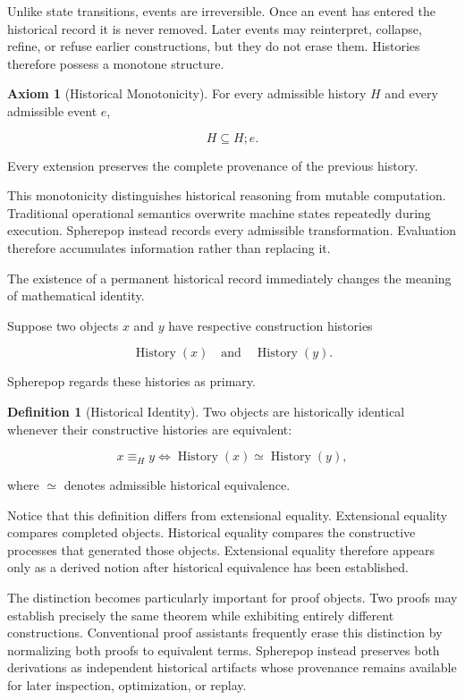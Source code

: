 \documentclass[12pt,oneside]{article}
\theoremstyle{definition}
\newtheorem{definition}[theorem]{Definition}
\newtheorem{axiom}[theorem]{Axiom}
\theoremstyle{remark}
\DeclareMathOperator{\History}{History}
\begin{document}
Unlike state transitions, events are irreversible. Once an event has entered the historical record it is never removed. Later events may reinterpret, collapse, refine, or refuse earlier constructions, but they do not erase them. Histories therefore possess a monotone structure.

\begin{axiom}[Historical Monotonicity]
For every admissible history $H$ and every admissible event $e$,

\[
H
\subseteq
H;e.
\]

Every extension preserves the complete provenance of the previous history.
\end{axiom}

This monotonicity distinguishes historical reasoning from mutable computation. Traditional operational semantics overwrite machine states repeatedly during execution. Spherepop instead records every admissible transformation. Evaluation therefore accumulates information rather than replacing it.

The existence of a permanent historical record immediately changes the meaning of mathematical identity.

Suppose two objects $x$ and $y$ have respective construction histories

\[
\History(x)
\quad\text{and}\quad
\History(y).
\]

Spherepop regards these histories as primary.

\begin{definition}[Historical Identity]
Two objects are historically identical whenever their constructive histories are equivalent:

\[
x \equiv_H y
\Longleftrightarrow
\History(x)
\simeq
\History(y),
\]

where $\simeq$ denotes admissible historical equivalence.
\end{definition}

Notice that this definition differs from extensional equality. Extensional equality compares completed objects. Historical equality compares the constructive processes that generated those objects. Extensional equality therefore appears only as a derived notion after historical equivalence has been established.

The distinction becomes particularly important for proof objects. Two proofs may establish precisely the same theorem while exhibiting entirely different constructions. Conventional proof assistants frequently erase this distinction by normalizing both proofs to equivalent terms. Spherepop instead preserves both derivations as independent historical artifacts whose provenance remains available for later inspection, optimization, or replay.
\end{document}
